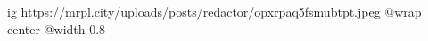  
 
 
 
 

\ifcmt
  ig https://mrpl.city/uploads/posts/redactor/opxrpaq5fsmubtpt.jpeg
  @wrap center
  @width 0.8
\fi
